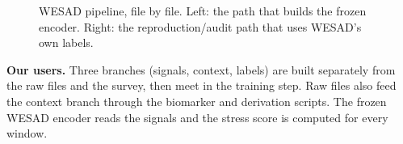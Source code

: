 \documentclass[11pt,a4paper]{article}
\begin{document}
\begin{figure}[H]
\caption{WESAD pipeline, file by file. Left: the path that builds the frozen encoder. Right: the
reproduction/audit path that uses WESAD's own labels.}
\label{fig:wesad}
\end{figure}

\textbf{Our users.} Three branches (signals, context, labels) are built separately from the raw files
and the survey, then meet in the training step. Raw files also feed the context branch through the
biomarker and derivation scripts. The frozen WESAD encoder reads the signals and the stress score is
computed for every window.
\end{document}
